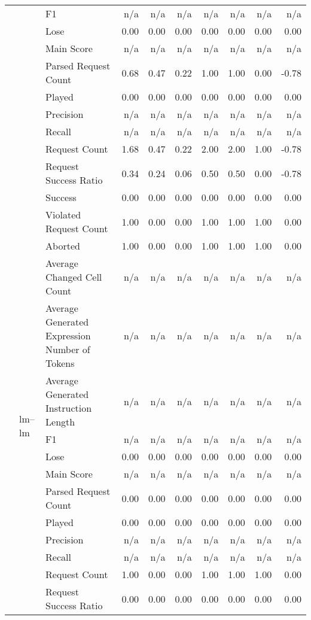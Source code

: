 \begin{tabular}{lllrrrrrrr}
 &  & F1 & n/a & n/a & n/a & n/a & n/a & n/a & n/a \\
 &  & Lose & 0.00 & 0.00 & 0.00 & 0.00 & 0.00 & 0.00 & 0.00 \\
 &  & Main Score & n/a & n/a & n/a & n/a & n/a & n/a & n/a \\
 &  & Parsed Request Count & 0.68 & 0.47 & 0.22 & 1.00 & 1.00 & 0.00 & -0.78 \\
 &  & Played & 0.00 & 0.00 & 0.00 & 0.00 & 0.00 & 0.00 & 0.00 \\
 &  & Precision & n/a & n/a & n/a & n/a & n/a & n/a & n/a \\
 &  & Recall & n/a & n/a & n/a & n/a & n/a & n/a & n/a \\
 &  & Request Count & 1.68 & 0.47 & 0.22 & 2.00 & 2.00 & 1.00 & -0.78 \\
 &  & Request Success Ratio & 0.34 & 0.24 & 0.06 & 0.50 & 0.50 & 0.00 & -0.78 \\
 &  & Success & 0.00 & 0.00 & 0.00 & 0.00 & 0.00 & 0.00 & 0.00 \\
 &  & Violated Request Count & 1.00 & 0.00 & 0.00 & 1.00 & 1.00 & 1.00 & 0.00 \\
\cline{2-10}
 & \multirow[t]{15}{*}{lm--lm} & Aborted & 1.00 & 0.00 & 0.00 & 1.00 & 1.00 & 1.00 & 0.00 \\
 &  & Average Changed Cell Count & n/a & n/a & n/a & n/a & n/a & n/a & n/a \\
 &  & Average Generated Expression Number of Tokens & n/a & n/a & n/a & n/a & n/a & n/a & n/a \\
 &  & Average Generated Instruction Length & n/a & n/a & n/a & n/a & n/a & n/a & n/a \\
 &  & F1 & n/a & n/a & n/a & n/a & n/a & n/a & n/a \\
 &  & Lose & 0.00 & 0.00 & 0.00 & 0.00 & 0.00 & 0.00 & 0.00 \\
 &  & Main Score & n/a & n/a & n/a & n/a & n/a & n/a & n/a \\
 &  & Parsed Request Count & 0.00 & 0.00 & 0.00 & 0.00 & 0.00 & 0.00 & 0.00 \\
 &  & Played & 0.00 & 0.00 & 0.00 & 0.00 & 0.00 & 0.00 & 0.00 \\
 &  & Precision & n/a & n/a & n/a & n/a & n/a & n/a & n/a \\
 &  & Recall & n/a & n/a & n/a & n/a & n/a & n/a & n/a \\
 &  & Request Count & 1.00 & 0.00 & 0.00 & 1.00 & 1.00 & 1.00 & 0.00 \\
 &  & Request Success Ratio & 0.00 & 0.00 & 0.00 & 0.00 & 0.00 & 0.00 & 0.00 \\

\end{tabular}
